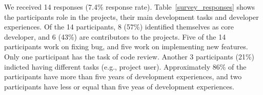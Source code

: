 We received 14 responses (7.4\% response rate). Table~\ref{survey_responses} shows the participants role in the projects, their main development tasks and developer experiences. Of the 14 participants, 8 (57\%) identified themselves as core developer, and 6 (43\%) are contributors to the projects. Five of the 14 participants work on fixing bug, and five work on implementing new features. Only one participant has the task of code review. Another 3 participants (21\%) indicted having different tasks (e.g., project user). Approximately 86\% of the participants have more than five years of development experiences, and two participants have less or equal than five yeas of development experiences.





